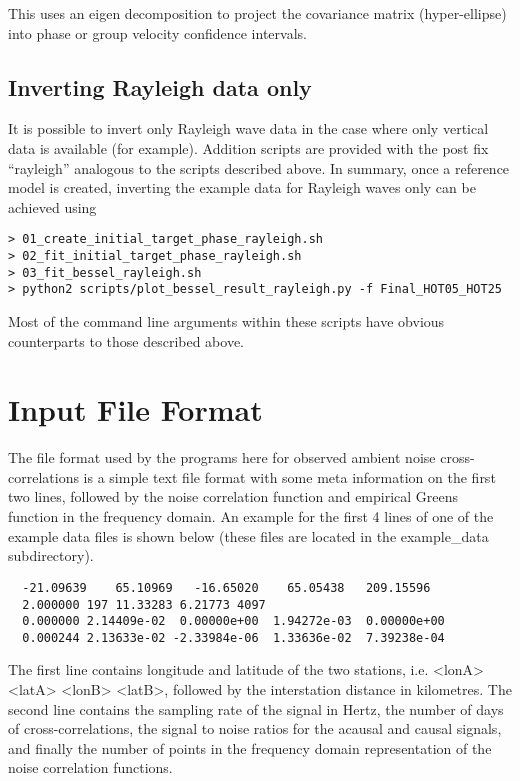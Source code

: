 \documentclass{article}
\begin{document}
This uses an eigen decomposition to project the covariance matrix
(hyper-ellipse) into phase or group velocity confidence intervals.

\subsection{Inverting Rayleigh data only}

It is possible to invert only Rayleigh wave data in the case where only vertical
data is available (for example). Addition scripts are provided with the post
fix ``rayleigh'' analogous to the scripts described above. In summary,
once a reference model is created, inverting the example data for Rayleigh waves
only can be achieved using

\begin{verbatim}
> 01_create_initial_target_phase_rayleigh.sh
> 02_fit_initial_target_phase_rayleigh.sh
> 03_fit_bessel_rayleigh.sh
> python2 scripts/plot_bessel_result_rayleigh.py -f Final_HOT05_HOT25
\end{verbatim}

Most of the command line arguments within these scripts have obvious counterparts
to those described above.

\appendix
  
\section{Input File Format}

The file format used by the programs here for observed ambient noise
cross-correlations is a simple text file format with some meta
information on the first two lines, followed by the noise correlation
function and empirical Greens function in the frequency domain.  An
example for the first 4 lines of one of the example data files is
shown below (these files are located in the example\_data
subdirectory).

\begin{verbatim}
  -21.09639    65.10969   -16.65020    65.05438   209.15596
  2.000000 197 11.33283 6.21773 4097
  0.000000 2.14409e-02  0.00000e+00  1.94272e-03  0.00000e+00
  0.000244 2.13633e-02 -2.33984e-06  1.33636e-02  7.39238e-04
\end{verbatim}

The first line contains longitude and latitude of the two stations,
i.e. <lonA> <latA> <lonB> <latB>, followed by the interstation
distance in kilometres. The second line contains the sampling rate of
the signal in Hertz, the number of days of cross-correlations, the
signal to noise ratios for the acausal and causal signals, and finally
the number of points in the frequency domain representation of the
noise correlation functions.
\end{document}
